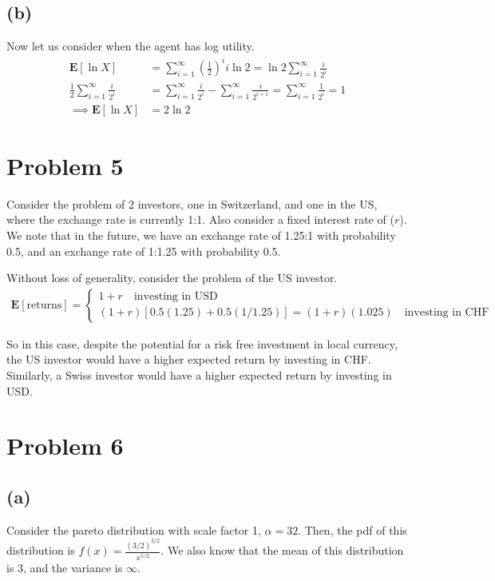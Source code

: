 \documentclass{article}
\begin{document}
	\subsection*{(b)}
	Now let us consider when the agent has log utility.
	\begin{align*}
	\mathbf{E}[\ln X] &= \sum_{i=1}^{\infty}(\frac{1}{2})^i i \ln 2  = \ln 2 \sum_{i=1}^{\infty} \frac{i}{2^i}\\
	\frac{1}{2} \sum_{i=1}^{\infty} \frac{i}{2^i} &= \sum_{i=1}^{\infty} \frac{i}{2^i}  - \sum_{i=1}^{\infty} \frac{i}{2^{i+1}} = \sum_{i=1}^{\infty} \frac{1}{2^i} = 1 \\
	\implies \mathbf{E}[\ln X] &= 2 \ln 2	
	\end{align*}
	
	\section*{Problem 5}
	Consider the problem of 2 investors, one in Switzerland, and one in the US, where the exchange rate is currently 1:1. Also consider a fixed interest rate of ($r$). We note that in the future, we have an exchange rate of 1.25:1 with probability 0.5, and an exchange rate of 1:1.25 with probability 0.5.
	
	Without loss of generality, consider the problem of the US investor.
	\begin{align*}
	\mathbf{E}[\text{returns}] = \begin{cases} 
	1 + r \quad \text{investing in USD}\\
	(1+r)[0.5(1.25) + 0.5(1/1.25)] = (1+r)(1.025) \quad \text{investing in CHF}
	\end{cases}
	\end{align*}
	
	So in this case, despite the potential for a risk free investment in local currency, the US investor would have a higher expected return by investing in CHF. Similarly, a Swiss investor would have a higher expected return by investing in USD.
	
	\section*{Problem 6}
	\subsection*{(a)}
	Consider the pareto distribution with scale factor 1, $\alpha = {3}{2}$. Then, the pdf of this distribution is $f(x) = \frac{(3/2)^{3/2}}{x^{5/2}}$. We also know that the mean of this distribution is 3, and the variance is $\infty$.
	
\end{document}
